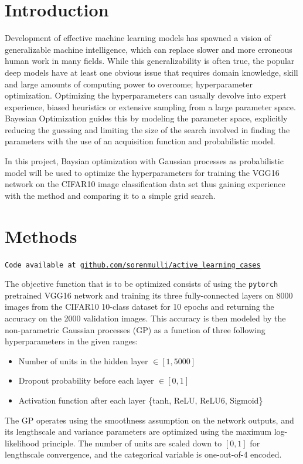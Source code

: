 \documentclass[12pt,fleqn]{article}
\begin{document}
\begin{multicols}{2}


\section{Introduction} 
Development of effective machine learning models has spawned a vision of generalizable machine intelligence, which can replace slower and more erroneous human work in many fields. While this generalizability is often true, the popular deep models have at least one obvious issue that requires domain knowledge, skill and large amounts of computing power to overcome; hyperparameter optimization. Optimizing the hyperparameters can usually devolve into expert experience, biased heuristics or extensive sampling from a large parameter space. Bayesian Optimization guides this by modeling the parameter space, explicitly reducing the guessing and limiting the size of the search involved in finding the parameters with the use of an acquisition function and probabilistic model.

In this project, Baysian optimization with Gaussian processes as probabilistic model will be used to optimize the hyperparameters for training the VGG16 network on the CIFAR10 image classification data set thus gaining experience with the method and comparing it to a simple grid search.
\vspace*{-0.3cm}
\section{Methods}
\vspace*{-0.2cm}
\texttt{Code available at \url{github.com/sorenmulli/active_learning_cases}}

The objective function that is to be optimized consists of using the \texttt{pytorch} pretrained VGG16 network \cite{vgg} and training its three fully-connected layers on 8000 images from the CIFAR10 10-class dataset \cite{cifar10} for 10 epochs and returning the accuracy on the 2000 validation images. 
This accuracy is then modeled by the non-parametric Gaussian processes (GP) as a function of three following hyperparameters in the given ranges:
\vspace*{-0.05cm}
\begin{itemize}
	\item Number of units in the hidden layer \(\in [1, 5000]\) 
	\item Dropout probability before each layer \(\in [0,1]\)
	\item Activation function after each layer \{tanh, ReLU, ReLU6, Sigmoid\}
\end{itemize}
The GP operates using the smoothness assumption on the network outputs, and its lengthscale and variance parameters are optimized using the maximum log-likelihood principle. The number of units are scaled down to \([0,1]\) for lengthscale convergence, and the categorical variable is one-out-of-4 encoded. 


\end{multicols}
\end{document}
